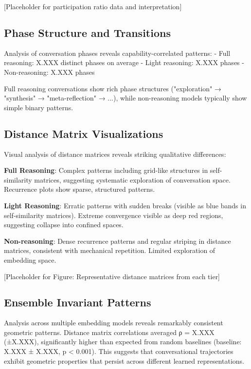 \documentclass[11pt,letterpaper]{article}
\newcommand{\fullPhaseCount}{X.XXX}
\newcommand{\lightPhaseCount}{X.XXX}
\newcommand{\nonPhaseCount}{X.XXX}
\newcommand{\ensembleDistanceCorr}{X.XXX}
\newcommand{\ensembleDistanceCorrStd}{X.XXX}
\newcommand{\ensembleBaselineCorr}{X.XXX}
\newcommand{\ensembleBaselineStd}{X.XXX}
\begin{document}
[Placeholder for participation ratio data and interpretation]

\subsection{Phase Structure and Transitions}

Analysis of conversation phases reveals capability-correlated patterns:
- Full reasoning: \fullPhaseCount{} distinct phases on average
- Light reasoning: \lightPhaseCount{} phases
- Non-reasoning: \nonPhaseCount{} phases

Full reasoning conversations show rich phase structures ("exploration" → "synthesis" → "meta-reflection" → ...), while non-reasoning models typically show simple binary patterns.

\subsection{Distance Matrix Visualizations}

Visual analysis of distance matrices reveals striking qualitative differences:

\textbf{Full Reasoning}: Complex patterns including grid-like structures in self-similarity matrices, suggesting systematic exploration of conversation space. Recurrence plots show sparse, structured patterns.

\textbf{Light Reasoning}: Erratic patterns with sudden breaks (visible as blue bands in self-similarity matrices). Extreme convergence visible as deep red regions, suggesting collapse into confined spaces.

\textbf{Non-reasoning}: Dense recurrence patterns and regular striping in distance matrices, consistent with mechanical repetition. Limited exploration of embedding space.

[Placeholder for Figure: Representative distance matrices from each tier]

\subsection{Ensemble Invariant Patterns}

Analysis across multiple embedding models reveals remarkably consistent geometric patterns. Distance matrix correlations averaged ρ = \ensembleDistanceCorr{} (±\ensembleDistanceCorrStd{}), significantly higher than expected from random baselines (baseline: \ensembleBaselineCorr{} ± \ensembleBaselineStd{}, p < 0.001). This suggests that conversational trajectories exhibit geometric properties that persist across different learned representations.
\end{document}
